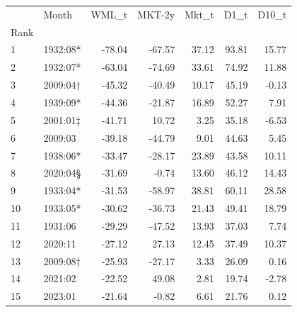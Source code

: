 \begin{table}[htbp]
  \centering
  \caption{table 02 worst WML months}
  \label{tab:table_02_worst_WML_months}
  \begin{table}
\thright
\tdright
\begin{tabular}{llrrrrr}
 & Month & WML_t & MKT-2y & Mkt_t & D1_t & D10_t \\
Rank &  &  &  &  &  &  \\
1 & 1932:08* & -78.04 & -67.57 & 37.12 & 93.81 & 15.77 \\
2 & 1932:07* & -63.04 & -74.69 & 33.61 & 74.92 & 11.88 \\
3 & 2009:04† & -45.32 & -40.49 & 10.17 & 45.19 & -0.13 \\
4 & 1939:09* & -44.36 & -21.87 & 16.89 & 52.27 & 7.91 \\
5 & 2001:01‡ & -41.71 & 10.72 & 3.25 & 35.18 & -6.53 \\
6 & 2009:03 & -39.18 & -44.79 & 9.01 & 44.63 & 5.45 \\
7 & 1938:06* & -33.47 & -28.17 & 23.89 & 43.58 & 10.11 \\
8 & 2020:04§ & -31.69 & -0.74 & 13.60 & 46.12 & 14.43 \\
9 & 1933:04* & -31.53 & -58.97 & 38.81 & 60.11 & 28.58 \\
10 & 1933:05* & -30.62 & -36.73 & 21.43 & 49.41 & 18.79 \\
11 & 1931:06 & -29.29 & -47.52 & 13.93 & 37.03 & 7.74 \\
12 & 2020:11 & -27.12 & 27.13 & 12.45 & 37.49 & 10.37 \\
13 & 2009:08† & -25.93 & -27.17 & 3.33 & 26.09 & 0.16 \\
14 & 2021:02 & -22.52 & 49.08 & 2.81 & 19.74 & -2.78 \\
15 & 2023:01 & -21.64 & -0.82 & 6.61 & 21.76 & 0.12 \\
\end{tabular}
\end{table}

\end{table}
